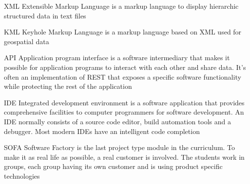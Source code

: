 
  {XML}            %
  {Extensible Markup Language}  %
  {is a markup language to display hierarchic structured data in text files} %

  {KML}            %
  {Keyhole Markup Language}  %
  {is a markup language based on XML used for geospatial data} %
  
	{API}            %
	{Application program interface}  %
	{is a software intermediary that makes it possible for application programs to interact with each other and share data. It's often an implementation of REST that exposes a specific software functionality while protecting the rest of the application} %
  
	{IDE}            %
	{Integrated development environment}  %
	{is a software application that provides comprehensive facilities to computer programmers for software development. An IDE normally consists of a source code editor, build automation tools and a debugger. Most modern IDEs have an intelligent code completion} %

	{SOFA}            %
	{Software Factory}  %
	{is the last project type module in the curriculum. To make it as real life as possible, a real customer is involved. The students work in groups, each group having its own customer and is using product specific technologies\cite{FoSE14}} %